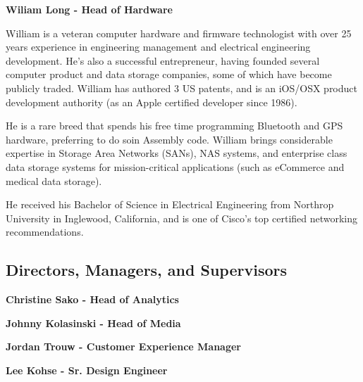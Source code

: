 \documentclass{article}
\begin{document}
\begin {framed}
\begin {center}
\textbf{Wiliam Long - Head of Hardware}\par
\end {center}
William is a veteran computer hardware and firmware technologist with over 25 years experience in engineering management and electrical engineering development. He's also a successful entrepreneur, having founded several computer product and data storage companies, some of which have become publicly traded. William has authored 3 US patents, and is an iOS/OSX product development authority (as an Apple certified developer since 1986).

He is a rare breed that spends his free time programming Bluetooth and GPS hardware, preferring to do soin Assembly code. William brings considerable expertise in Storage Area Networks (SANs), NAS systems, and enterprise class data storage systems for mission-critical applications (such as eCommerce and medical data storage).

He received his Bachelor of Science in Electrical Engineering from Northrop University in Inglewood, California, and is one of Cisco's top certified networking recommendations.

\end {framed}

\subsection{Directors, Managers, and Supervisors}
\begin {framed}
\begin {center}
\textbf{Christine Sako - Head of Analytics}
\end {center}
\end {framed}

\begin {framed}
\begin {center}
\textbf{Johnny Kolasinski - Head of Media}
\end {center}
\end {framed}

\begin {framed}
\begin {center}
\textbf{Jordan Trouw -  Customer Experience Manager}
\end {center}
\end {framed}

\begin {framed}
\begin {center}
\textbf{Lee Kohse - Sr. Design Engineer}
\end {center}
\end {framed}
\end{document}
